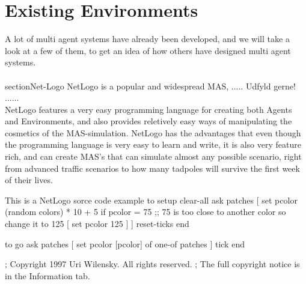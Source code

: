 \chapter{Existing Environments}

A lot of multi agent systems have already been developed, and we will take a look at a few of them, to get an idea of how others have designed multi agent systems.\\
\\
section{Net-Logo}
NetLogo is a popular and widespread MAS, ..... Udfyld gerne! ......\\
\indent NetLogo features a very easy programming language for creating both Agents and Environments, and also provides reletively easy ways of manipulating the cosmetics of the MAS-simulation. NetLogo has the advantages that even though the programming language is very easy to learn and write, it is also very feature rich, and can create MAS's that can simulate almost any possible scenario, right from advanced traffic scenarios to how many tadpoles will survive the first week of their lives.

\begin{NetLogo}{This is a NetLogo sorce code example}{}
to setup
  clear-all
  ask patches
    [ set pcolor (random colors) * 10 + 5
        if pcolor = 75  ;; 75 is too close to another color so change it to 125
          [ set pcolor 125 ] ]
  reset-ticks
end

to go
  ask patches [ set pcolor [pcolor] of one-of patches ]
  tick
end


; Copyright 1997 Uri Wilensky. All rights reserved.
; The full copyright notice is in the Information tab.
\end{NetLogo}

